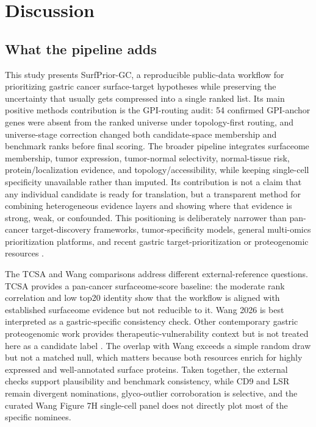 \documentclass[preprint,12pt,authoryear]{elsarticle}
\begin{document}
\FloatBarrier
\section{Discussion}

\subsection{What the pipeline adds}

This study presents SurfPrior-GC, a reproducible public-data workflow for prioritizing gastric cancer surface-target hypotheses while preserving the uncertainty that usually gets compressed into a single ranked list. Its main positive methods contribution is the GPI-routing audit: 54 confirmed GPI-anchor genes were absent from the ranked universe under topology-first routing, and universe-stage correction changed both candidate-space membership and benchmark ranks before final scoring. The broader pipeline integrates surfaceome membership, tumor expression, tumor-normal selectivity, normal-tissue risk, protein/\allowbreak{}localization evidence, and topology/\allowbreak{}accessibility, while keeping single-cell specificity unavailable rather than imputed. Its contribution is not a claim that any individual candidate is ready for translation, but a transparent method for combining heterogeneous evidence layers and showing where that evidence is strong, weak, or confounded. This positioning is deliberately narrower than pan-cancer target-discovery frameworks, tumor-specificity models, general multi-omics prioritization platforms, and recent gastric target-prioritization or proteogenomic resources \citep{li2022pancancer,razzaghdoust2021adc,kathad2024adc,deng2024multiomics2targets,moek2017adc_landscape,li2024bayests,xu2025gastric_targets,chang2026gastric_proteogenomics}.

The TCSA and Wang comparisons address different external-reference questions. TCSA provides a pan-cancer surfaceome-score baseline: the moderate rank correlation and low top20 identity show that the workflow is aligned with established surfaceome evidence but not reducible to it. Wang 2026 is best interpreted as a gastric-specific consistency check. Other contemporary gastric proteogenomic work provides therapeutic-vulnerability context but is not treated here as a candidate label \citep{chang2026gastric_proteogenomics}. The overlap with Wang exceeds a simple random draw but not a matched null, which matters because both resources enrich for highly expressed and well-annotated surface proteins. Taken together, the external checks support plausibility and benchmark consistency, while CD9 and LSR remain divergent nominations, glyco-outlier corroboration is selective, and the curated Wang Figure 7H single-cell panel does not directly plot most of the specific nominees.
\end{document}
